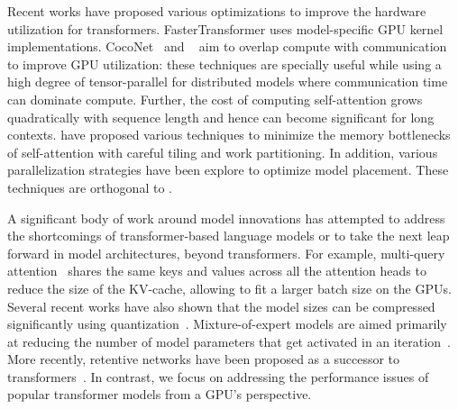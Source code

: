  Recent works have proposed various optimizations to improve the hardware utilization for transformers. FasterTransformer uses model-specific GPU kernel implementations. CocoNet~\cite{coconetasplos} and ~\cite{googleoverlap} aim to overlap compute with communication to improve GPU utilization: these techniques are specially useful while using a high degree of tensor-parallel for distributed models where communication time can dominate compute. Further, the cost of computing self-attention grows quadratically with sequence length and hence can become significant for long contexts. \cite{self:attn:on2:memory, flashattention, flashattention2} have proposed various techniques to minimize the memory bottlenecks of self-attention with careful tiling and work partitioning. In addition, various parallelization strategies have been explore to optimize model placement. These techniques are orthogonal to \sysname.  


 A significant body of work around model innovations has attempted to address the shortcomings of  transformer-based language models or to take the next leap forward in model architectures, beyond transformers. For example, multi-query attention~\cite{multiqueryattention} shares the same keys and values across all the attention heads to reduce the size of the KV-cache, allowing to fit a larger batch size on the GPUs. Several recent works have also shown that the model sizes can be compressed significantly using quantization~\cite{smoothquant,gptq,qlora,llmint8}. Mixture-of-expert models are aimed primarily at reducing the number of model parameters that get activated in an iteration~\cite{largescalemoe,moeatc23,moedeployment}. More recently, retentive networks have been proposed as a successor to transformers~\cite{retnet}. In contrast, we focus on addressing the performance issues of popular transformer models from a GPU's perspective. 

